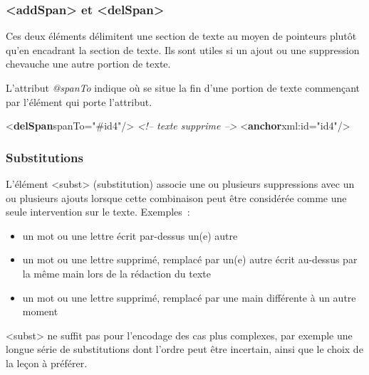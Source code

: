 \documentclass[]{beamer}\makeatletter
\begin{document}
\begin{frame}[fragile]
\frametitle{{\color{blue2}<addSpan>} et {\color{blue2}<delSpan>}}\par
Ces deux éléments délimitent une section de texte au moyen de      pointeurs plutôt qu’en encadrant la section de texte. Ils sont utiles      si un ajout ou une suppression chevauche une autre portion de      texte.\par
L’attribut \emph{@spanTo} indique où se situe la fin d’une portion      de texte commençant par l’élément qui porte l’attribut.\par
      
\bgroup\ttfamily\fontsize{8.5pt}{9pt}\selectfont\par
\begin{exampleblock}{}
\noindent\ttfamily\mbox{}{\color{blue1}<\textbf{delSpan}\hspace*{6pt}spanTo="{\color{blue2}#id4}"/>}\mbox{}\newline 
\textit{<!-- texte supprime -->}\mbox{}\newline 
{\color{blue1}<\textbf{anchor}\hspace*{6pt}xml:id="{\color{blue2}id4}"/>}
\end{exampleblock}
\par\egroup
       
\end{frame}

\begin{frame}
\frametitle{Substitutions}\par
 L’élément {\color{blue2}<subst>} (substitution) associe une ou plusieurs      suppressions avec un ou plusieurs ajouts lorsque cette combinaison      peut être considérée comme une seule intervention sur le texte.      Exemples : \begin{itemize}

\item  un mot ou une lettre écrit par-dessus un(e) autre
\item  un mot ou une lettre supprimé, remplacé par un(e) autre écrit        au-dessus par la même main lors de la rédaction du texte
\item  un mot ou une lettre supprimé, remplacé par une main        différente à un autre moment
\end{itemize}      \par\begin{exampleblock}{}
{\color{blue2}<subst>} ne suffit pas pour l'encodage des cas plus complexes, par exemple une longue série de substitutions dont l’ordre peut être incertain, ainsi que        le choix de la leçon à préférer. \end{exampleblock}\par

\end{frame}
\end{document}
